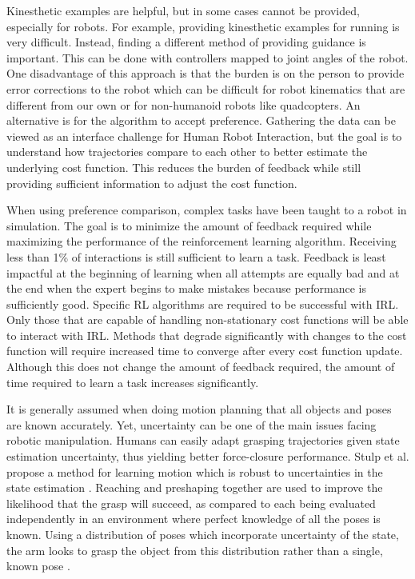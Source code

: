 \documentclass{article}
\begin{document}
    Kinesthetic examples are helpful, but in some cases cannot be provided, especially for robots.  For example, providing kinesthetic examples for running is very difficult.  Instead, finding a different method of providing guidance is important.  This can be done with controllers mapped to joint angles of the robot\cite{mericcli2010biped, DAgger}.  One disadvantage of this approach is that the burden is on the person to provide error corrections to the robot which can be difficult for robot kinematics that are different from our own or for non-humanoid robots like quadcopters.  An alternative is for the algorithm to accept preference.  Gathering the data can be viewed as an interface challenge for Human Robot Interaction, but the goal is to understand how trajectories compare to each other to better estimate the underlying cost function\cite{Akrour2014,  Christiano2017}.  This reduces the burden of feedback while still providing sufficient information to adjust the cost function.
    
    When using preference comparison, complex tasks have been taught to a robot in simulation\cite{Christiano2017}.  The goal is to minimize the amount of feedback required while maximizing the performance of the reinforcement learning algorithm.  Receiving less than 1\% of interactions is still sufficient to learn a task\cite{Christiano2017}.  Feedback is least impactful at the beginning of learning when all attempts are equally bad and at the end when the expert begins to make mistakes because performance is sufficiently good\cite{Akrour2014}.  Specific RL algorithms are required to be successful with IRL.  Only those that are capable of handling non-stationary cost functions will be able to interact with IRL.  Methods that degrade significantly with changes to the cost function will require increased time to converge after every cost function update.  Although this does not change the amount of feedback required, the amount of time required to learn a task increases significantly.
    
    It is generally assumed when doing motion planning that all objects and poses are known accurately. Yet, uncertainty can be one of the main issues facing robotic manipulation. Humans can easily adapt grasping trajectories given state estimation uncertainty, thus yielding better force-closure performance. Stulp et al. propose a method for learning motion which is robust to uncertainties in the state estimation \cite{stulp2011learning}. Reaching and preshaping together are used to improve the likelihood that the grasp will succeed, as compared to each being evaluated independently in an environment where perfect knowledge of all the poses is known. Using a distribution of poses which incorporate uncertainty of the state, the arm looks to grasp the object from this distribution rather than a single, known pose \cite{stulp2011learning}.
\end{document}
